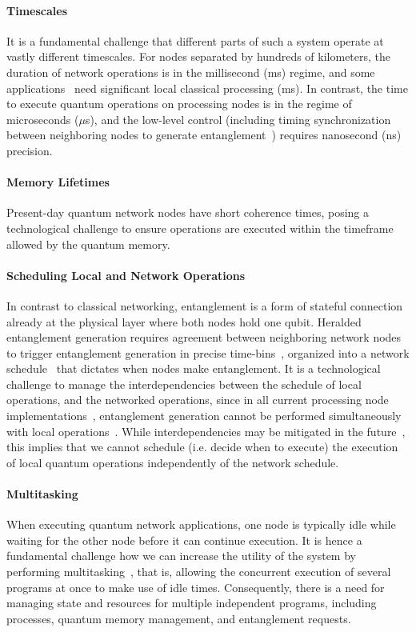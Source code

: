 \paragraph{Timescales}
It is a fundamental challenge that different parts of such a system operate at vastly different timescales. For nodes separated by hundreds of kilometers, the duration of network operations is in the millisecond (ms) regime, and some applications~\cite{wehner_2018_stages} need  significant local classical processing (ms). In contrast, the time to execute quantum operations on processing nodes is in the regime of microseconds ($\mu$s), and the low-level control (including timing synchronization between neighboring nodes to generate entanglement~\cite{humphreys_2018_delivery}) requires nanosecond (ns) precision.

\paragraph{Memory Lifetimes}
Present-day quantum network nodes have short coherence times, posing a technological challenge to ensure operations are executed within the timeframe allowed by the quantum memory.

\paragraph{Scheduling Local and Network Operations}
In contrast to classical networking, entanglement is a form of stateful connection already at the physical layer where both nodes hold one qubit. Heralded entanglement generation requires agreement between neighboring network nodes to trigger entanglement generation in precise time-bins~\cite{dahlberg_2019_egp}, organized into a network schedule~\cite{skrzypczyk_2021_arch} that dictates when nodes make entanglement. It is a technological challenge to manage the interdependencies between the schedule of local operations, and the networked operations, since in all current processing node implementations~\cite{pompili_2021_multinode,drmota_robust_2023}, entanglement generation cannot be performed simultaneously with local operations~\cite{pompili_2021_multinode,krutyanskiy_light-matter_2019}. While interdependencies may be mitigated in the future~\cite{vardoyan_2022_netarch}, this implies that we cannot schedule (i.e. decide when to execute) the execution of local quantum operations independently of the network schedule.

\paragraph{Multitasking}
When executing quantum network applications, one node is typically idle while waiting for the other node before it can continue execution. It is hence a fundamental challenge how we can increase the utility of the system by performing multitasking~\cite{mccullough_design_1965-1,dennis_segmentation_1965}, that is, allowing the concurrent execution of several programs at once to make use of idle times. Consequently, there is a need for managing state and resources for multiple independent programs, including processes, quantum memory management, and entanglement requests. 

